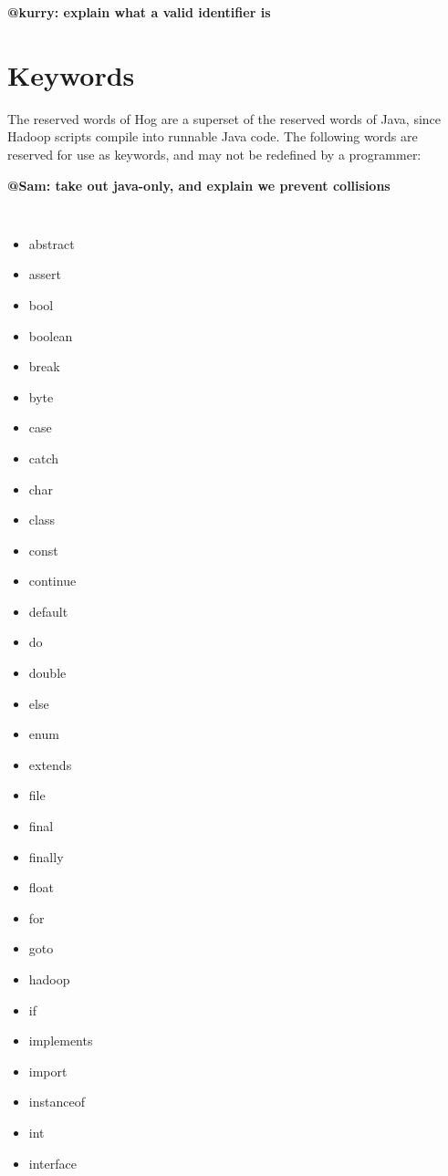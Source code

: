 \documentclass{book}
\begin{document}
\textbf{@kurry: explain what a valid identifier is}


\section{Keywords} %
\label{sec:keywords}

The reserved words of Hog are a superset of the reserved words of Java, since
Hadoop scripts compile into runnable Java code. The following words are reserved
for use as keywords, and may not be redefined by a programmer:

\textbf{@Sam: take out java-only, and explain we prevent collisions}

\begin{multicols}{4}
\tt
\begin{itemize}
  \item[] abstract
  \item[] assert
  \item[] bool
  \item[] boolean
  \item[] break
  \item[] byte
  \item[] case
  \item[] catch
  \item[] char
  \item[] class
  \item[] const
  \item[] continue
  \item[] default
  \item[] do
  \item[] double
  \item[] else
  \item[] enum
  \item[] extends
  \item[] file
  \item[] final
  \item[] finally
  \item[] float
  \item[] for
  \item[] goto
  \item[] hadoop
  \item[] if
  \item[] implements
  \item[] import
  \item[] instanceof
  \item[] int
  \item[] interface

\end{itemize}
\end{multicols}
\end{document}
